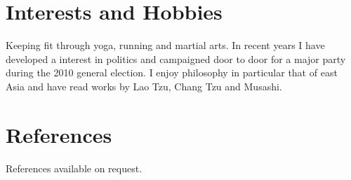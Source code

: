 \documentclass[11pt,a4paper,sans]{moderncv}
\begin{document}
\section{Interests and Hobbies}
Keeping fit through yoga, running and martial arts. In recent years I have developed a interest in politics and campaigned door to door for a major party during the 2010 general election. I enjoy philosophy in particular that of east Asia and have read works by Lao Tzu, Chang Tzu and Musashi.




\section{References}
References available on request.
\begin{comment}
\cvdoubleitem{Reference 1}{Dr Monika Seisenberger, \newline{}Department of Computer Science,\newline{} Swansea University,\newline{}
Singleton Park,\newline{} Swansea,  SA2 8PP, \newline{} UK, \newline{} M.Seisenberger@Swansea.ac.uk \newline Tel: (+44) (0)1792 602131}{Reference 2}{Professor Faron Moller, \newline{}Department of Computer Science,\newline{} Swansea University,\newline{}
Singleton Park,\newline{} Swansea,  SA2 8PP, \newline{} UK, \newline{} F.G.Moller@Swansea.ac.uk \newline Tel: (+44) (0)1792 295160}
\end{comment}
\nocite{*}
\medskip

               
\end{document}
